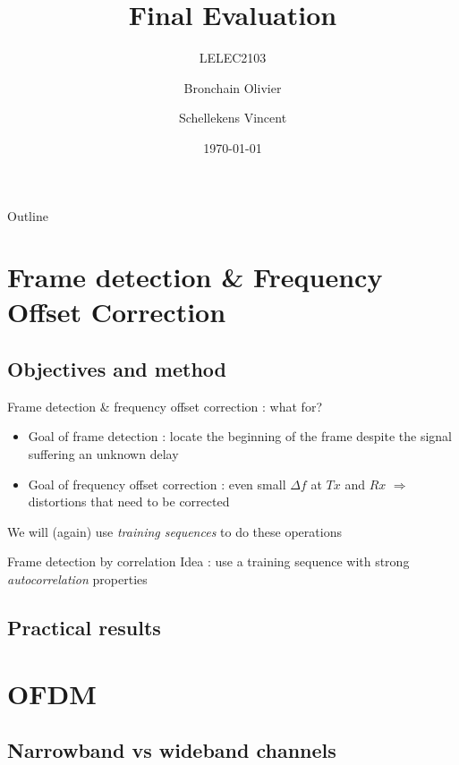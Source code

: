 \documentclass{beamer}
\title{Final Evaluation}
\subtitle{LELEC2103}
\author{Bronchain Olivier \and Schellekens Vincent}
\institute[Ecole Polytechnique de Louvain]{
    Ecole Polytechnique de Louvain} %
\date{\today}
\begin{document}
\begin{frame}
  \titlepage
\end{frame}

\begin{frame}{Outline}
  \tableofcontents
\end{frame}

\section{Frame detection \& Frequency Offset Correction}
\subsection{Objectives and method}
\begin{frame}{Frame detection \& frequency offset correction : what for?}
    \begin{itemize}
    \item Goal of frame detection : locate the beginning of the frame despite the signal suffering an unknown delay
    \item Goal of frequency offset correction : even small $\Delta f$ at $Tx$ and $Rx$ $\Rightarrow$ distortions that need to be corrected
    \end{itemize}
    We will (again) use \textit{training sequences} to do these operations
\end{frame}

\begin{frame}{Frame detection by correlation}
    Idea : use a training sequence with strong \textit{autocorrelation} properties
\end{frame}



\subsection{Practical results}




\section{OFDM}
\subsection{Narrowband vs wideband channels}
\end{document}
